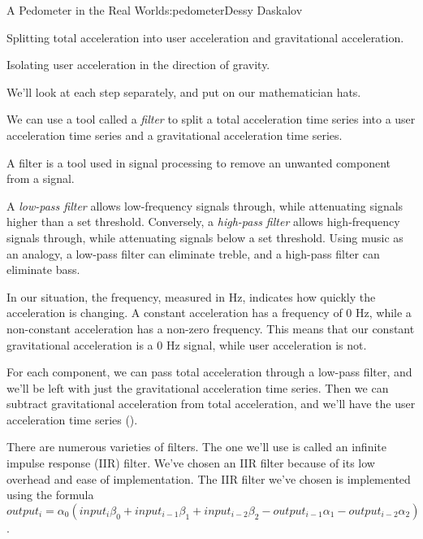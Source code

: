 \begin{aosachapter}{A Pedometer in the Real World}{s:pedometer}{Dessy Daskalov}
\begin{aosaenumerate}
\item
  Splitting total acceleration into user acceleration and gravitational
  acceleration.
\item
  Isolating user acceleration in the direction of gravity.
\end{aosaenumerate}

We'll look at each step separately, and put on our mathematician hats.

\label{splitting-total-acceleration-into-user-acceleration-and-gravitational-acceleration}

We can use a tool called a \emph{filter} to split a total acceleration
time series into a user acceleration time series and a gravitational
acceleration time series.

\label{low-pass-and-high-pass-filters}

A filter is a tool used in signal processing to remove an unwanted
component from a signal.

A \emph{low-pass filter} allows low-frequency signals through, while
attenuating signals higher than a set threshold. Conversely, a
\emph{high-pass filter} allows high-frequency signals through, while
attenuating signals below a set threshold. Using music as an analogy, a
low-pass filter can eliminate treble, and a high-pass filter can
eliminate bass.

In our situation, the frequency, measured in Hz, indicates how quickly
the acceleration is changing. A constant acceleration has a frequency of
0 Hz, while a non-constant acceleration has a non-zero frequency. This
means that our constant gravitational acceleration is a 0 Hz signal,
while user acceleration is not.

For each component, we can pass total acceleration through a low-pass
filter, and we'll be left with just the gravitational acceleration time
series. Then we can subtract gravitational acceleration from total
acceleration, and we'll have the user acceleration time series
().


There are numerous varieties of filters. The one we'll use is called an
infinite impulse response (IIR) filter. We've chosen an IIR filter
because of its low overhead and ease of implementation. The IIR filter
we've chosen is implemented using the formula
$output_{i} = \alpha_{0}(input_{i}\beta_{0} + input_{i-1}\beta_{1} + input_{i-2}\beta_{2} - output_{i-1}\alpha_{1} - output_{i-2}\alpha_{2})$.


\end{aosachapter}
